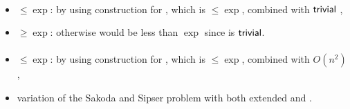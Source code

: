 \paragraph{\OLA{}\tto\TNFA}
\begin{itemize}
	\item $\le\exp$: by using construction for \hyperref[cost:1LAto1NFAu]{\OLA{}\tto\ONFA}, which is $\le\exp$, combined with $\mathsf{trivial}$ \ONFA{}\tto\TNFA,
	\item $\ge\exp$: otherwise \hyperref[cost:1DLAto2NFAu]{\ODLA{}\tto\TNFA} would be less than $\exp$ since \ODLA{}\tto\OLA is $\mathsf{trivial}$.
\end{itemize}
\paragraph{\OLA{}\tto\ODLA}
\begin{itemize}
	\item $\le\exp$: by using construction for \hyperref[cost:1LAto1NFAu]{\OLA{}\tto\ONFA}, which is $\le\exp$, combined with $O(n^2)$ \hyperref[cost:1NFAto1DLAu]{\ONFA{}\tto\ODLA},
	\item variation of the Sakoda and Sipser problem with both extended \TNFA and \TDFA.
\end{itemize}
